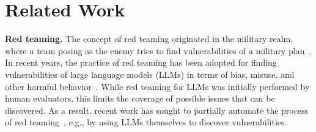 \section{Related Work}
\label{sec:related work} 


{\bf Red teaming.} The concept of red teaming originated in the military realm, where a team posing as the enemy tries to find vulnerabilities of a military plan~\cite{zenko2015red}. In recent years, the practice of red teaming has been adopted for finding vulnerabilities of large language models (LLMs) in terms of bias, misuse, and other harmful behavior~\cite{achiam2023gpt, team2023gemini, ganguli2022red, bai2022training, wei2024jailbroken}. While red teaming for LLMs was initially performed by human evaluators, this limits the coverage of possible issues that can be discovered. As a result, recent work has sought to partially automate the process of red teaming~\cite{perez2022red, tong2024mass, zou2023universal, chao2023jailbreaking, liu2023autodan, mehrotra2023tree}, e.g., by using LLMs themselves to discover vulnerabilities. 


